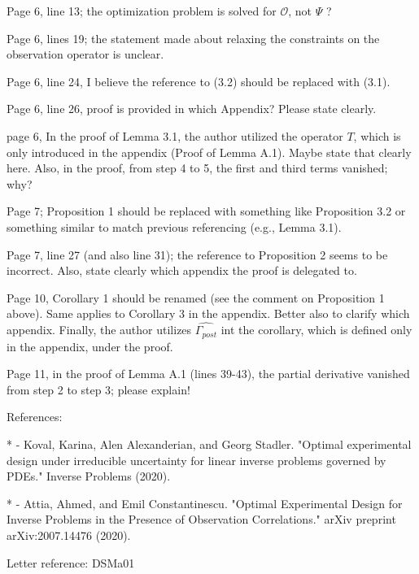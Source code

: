 \documentclass{amsart}
\begin{document}
Page 6, line 13; the optimization problem is solved for $\mathcal{O}$,
not $\Psi$ ?  
  
Page 6, lines 19; the statement made about relaxing the constraints on
the observation operator is unclear.  

Page 6, line 24, I believe the reference to (3.2) should be replaced
with (3.1). 

Page 6, line 26, proof is provided in which Appendix? Please state
clearly.

page 6, In the proof of Lemma 3.1, the author utilized the operator
$T$, which is only introduced in the appendix (Proof of Lemma
A.1). Maybe state that clearly here. Also, in the proof, from step 4
to 5, the first and third terms vanished; why?  

Page 7; Proposition 1 should be replaced with something like
Proposition 3.2 or something similar to match previous referencing
(e.g., Lemma 3.1). 

Page 7, line 27 (and also line 31); the reference to Proposition 2
seems to be incorrect. Also, state clearly which appendix the proof is
delegated to.  

Page 10, Corollary 1 should be renamed (see the comment on Proposition
1 above). Same applies to Corollary 3 in the appendix. Better also to
clarify which appendix. Finally, the author utilizes
$\widehat{\Gamma_{post}}$ int the corollary, which is defined only in
the appendix, under the proof. 

Page 11, in the proof of Lemma A.1 (lines 39-43), the partial
derivative vanished from step 2 to step 3; please explain!

References:

* - Koval, Karina, Alen Alexanderian, and Georg
Stadler. "Optimal experimental design under irreducible uncertainty
for linear inverse problems governed by PDEs." Inverse Problems
(2020).

* - Attia, Ahmed, and Emil Constantinescu. "Optimal Experimental
Design for Inverse Problems in the Presence of Observation
Correlations." arXiv preprint arXiv:2007.14476 (2020).

Letter reference: DSMa01
\end{document}
